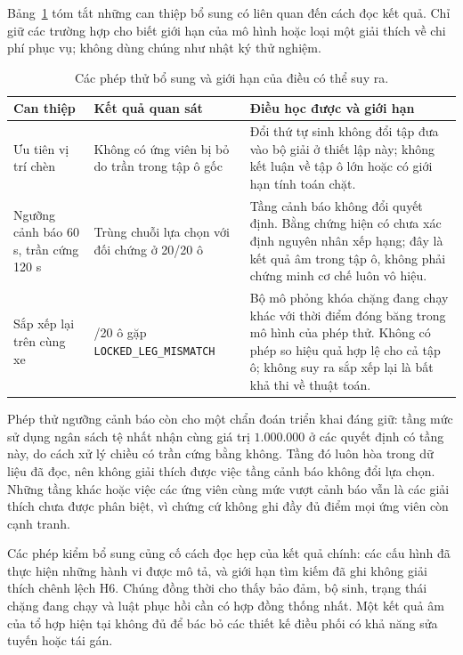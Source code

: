 Bảng~\ref{bang:kiemtra-am} tóm tắt những can thiệp bổ sung có liên quan đến cách
đọc kết quả. Chỉ giữ các trường hợp cho biết giới hạn của mô hình hoặc loại
một giải thích về chi phí phục vụ; không dùng chúng như nhật ký thử nghiệm.

\begin{table}[htbp]
\centering
\caption{Các phép thử bổ sung và giới hạn của điều có thể suy ra.}
\label{bang:kiemtra-am}
\small
\begin{tabular}{@{}>{\raggedright\arraybackslash}p{2.9cm}>{\raggedright\arraybackslash}p{4.1cm}>{\raggedright\arraybackslash}p{7.8cm}@{}}
\toprule
\textbf{Can thiệp} & \textbf{Kết quả quan sát} & \textbf{Điều học được và giới hạn}\\
\midrule
Ưu tiên vị trí chèn & Không có ứng viên bị bỏ do trần trong tập ô gốc &
Đổi thứ tự sinh không đổi tập đưa vào bộ giải ở thiết lập này; không kết luận về
tập ô lớn hoặc có giới hạn tính toán chặt.\\
Ngưỡng cảnh báo 60 s, trần cứng 120 s & Trùng chuỗi lựa chọn với đối chứng ở 20/20 ô &
Tầng cảnh báo không đổi quyết định. Bằng chứng hiện có chưa xác định nguyên nhân
xếp hạng; đây là kết quả âm trong tập ô, không phải chứng minh cơ chế luôn vô hiệu.\\
Sắp xếp lại trên cùng xe & 18/20 ô gặp \texttt{LOCKED\_LEG\_MISMATCH} &
Bộ mô phỏng khóa chặng đang chạy khác với thời điểm đóng băng trong mô hình của
phép thử. Không có phép so hiệu quả hợp lệ cho cả tập ô; không suy ra sắp xếp lại
là bất khả thi về thuật toán.\\
\bottomrule
\end{tabular}
\end{table}

Phép thử ngưỡng cảnh báo còn cho một chẩn đoán triển khai đáng giữ: tầng mức sử
dụng ngân sách tệ nhất nhận cùng giá trị $1.000.000$ ở các quyết định có tầng này,
do cách xử lý chiều có trần cứng bằng không. Tầng đó luôn hòa trong dữ liệu đã
đọc, nên không giải thích được việc tầng cảnh báo không đổi lựa chọn. Những tầng
khác hoặc việc các ứng viên cùng mức vượt cảnh báo vẫn là các giải thích chưa
được phân biệt, vì chứng cứ không ghi đầy đủ điểm mọi ứng viên còn cạnh tranh.

Các phép kiểm bổ sung củng cố cách đọc hẹp của kết quả chính: các cấu hình đã
thực hiện những hành vi được mô tả, và giới hạn tìm kiếm đã ghi không giải thích
chênh lệch H6. Chúng đồng thời cho thấy bảo đảm, bộ sinh, trạng thái chặng đang
chạy và luật phục hồi cần có hợp đồng thống nhất. Một kết quả âm của tổ hợp hiện
tại không đủ để bác bỏ các thiết kế điều phối có khả năng sửa tuyến hoặc tái gán.
